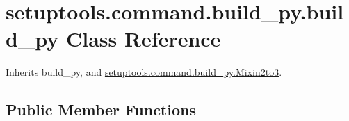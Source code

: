 \hypertarget{classsetuptools_1_1command_1_1build__py_1_1build__py}{}\section{setuptools.\+command.\+build\+\_\+py.\+build\+\_\+py Class Reference}
\label{classsetuptools_1_1command_1_1build__py_1_1build__py}


Inherits build\+\_\+py, and \hyperlink{classsetuptools_1_1command_1_1build__py_1_1_mixin2to3}{setuptools.\+command.\+build\+\_\+py.\+Mixin2to3}.

\subsection*{Public Member Functions}
